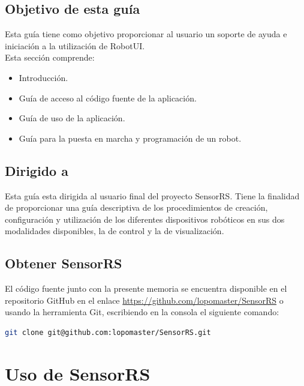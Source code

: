 \subsection{Objetivo de esta guía}

Esta guía tiene como objetivo proporcionar al usuario un soporte de ayuda e iniciación a la utilización de RobotUI.\\

Esta sección comprende:\\

\begin{itemize}
 \item Introducción.
 \item Guía de acceso al código fuente de la aplicación.
 \item Guía de uso de la aplicación.
 \item Guía para la puesta en marcha y programación de un robot.
\end{itemize}

\subsection{Dirigido a}

Esta guía esta dirigida al usuario final del proyecto SensorRS. Tiene la finalidad de proporcionar una guía descriptiva de los procedimientos de creación, configuración y utilización de los diferentes dispositivos 
robóticos en sus dos modalidades disponibles, la de control y la de visualización.

\subsection{Obtener SensorRS}

El código fuente junto con la presente memoria se encuentra disponible en el repositorio GitHub en el enlace \url{https://github.com/lopomaster/SensorRS} o usando la herramienta
Git, escribiendo en la consola el siguiente comando:\\

\begin{lstlisting}[language=bash]
 git clone git@github.com:lopomaster/SensorRS.git 
\end{lstlisting}


\section{ Uso de SensorRS }
\label{sec:uso-sensorrs}


